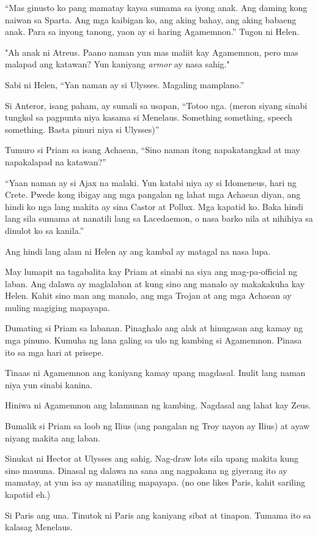 \documentclass[12pt,letterpaper]{report}
\begin{document}
``Mas ginusto ko pang mamatay kaysa sumama sa iyong anak. Ang daming kong naiwan sa Sparta. Ang mga kaibigan ko, ang aking bahay, ang aking babaeng anak. Para sa inyong tanong, yaon ay si haring Agamemnon.'' Tugon ni Helen.

"Ah anak ni Atreus. Paano naman yun mas maliit kay Agamemnon, pero mas malapad ang katawan?
Yun kaniyang \textit{armor} ay nasa sahig."

Sabi ni Helen, ``Yan naman ay si Ulysses. Magaling mamplano.''

Si Anteror, isang paham, ay sumali sa usapan, ``Totoo nga. (meron siyang sinabi tungkol sa pagpunta niya kasama si Menelaus. Something something, speech something. Basta pinuri niya si Ulysses)''

Tumuro si Priam sa isang Achaean, ``Sino naman itong napakatangkad at may napakalapad na katawan?''

``Yaan naman ay si Ajax na malaki. Yun katabi niya ay si Idomeneus, hari ng Crete. Pwede kong ibigay ang mga pangalan ng lahat mga Achaean diyan, ang hindi ko nga lang makita ay sina Castor at Pollux. Mga kapatid ko. Baka hindi lang sila sumama at nanatili lang sa Lacedaemon, o nasa barko nila at nihihiya sa dinulot ko sa kanila.''

Ang hindi lang alam ni Helen ay ang kambal ay matagal na nasa lupa.

May lumapit na tagabalita kay Priam at sinabi na siya ang mag-pa-official ng laban. Ang dalawa ay maglalaban at kung sino ang manalo ay makakakuha kay Helen. Kahit sino man ang manalo, ang mga Trojan at ang mga Achaean ay muling magiging mapayapa.

Dumating si Priam sa labanan. Pinaghalo ang alak at hinugasan ang kamay ng mga pinuno. Kumuha ng lana galing sa ulo ng kambing si Agamemnon. Pinasa ito sa mga hari at prisepe.

Tinaas ni Agamemnon ang kaniyang kamay upang magdasal. Inulit lang naman niya yun sinabi kanina.

Hiniwa ni Agamemnon ang lalamunan ng kambing. Nagdasal ang lahat kay Zeus.

Bumalik si Priam sa loob ng Ilius (ang pangalan ng Troy nayon ay Ilius) at ayaw niyang makita ang laban.

Sinukat ni Hector at Ulysses ang sahig. Nag-draw lots sila upang makita kung sino mauuna. Dinasal ng dalawa na sana ang nagpakana ng giyerang ito ay mamatay, at yun isa ay manatiling mapayapa. (no one likes Paris, kahit sariling kapatid eh.)

Si Paris ang una. Tinutok ni Paris ang kaniyang sibat at tinapon. Tumama ito sa kalasag Menelaus.
\end{document}
